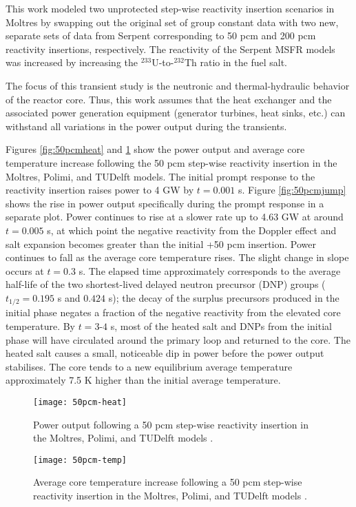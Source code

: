 This work modeled two unprotected step-wise reactivity insertion scenarios in
Moltres by swapping out the original set of group constant data with two new,
separate sets of data from Serpent corresponding to 50 pcm and 200 pcm
reactivity insertions, respectively. The reactivity of the Serpent \gls{MSFR}
models was increased by increasing the $^{233}$U-to-$^{232}$Th ratio in
the fuel salt.

The focus of this transient study is the neutronic and thermal-hydraulic
behavior of the reactor core. Thus, this work assumes that the heat exchanger
and the associated power generation equipment (generator turbines, heat sinks,
etc.) can withstand all variations in the power output during the transients.

Figures \ref{fig:50pcmheat} and \ref{fig:50pcmtemp} show the power output and
average core temperature increase following the 50 pcm step-wise reactivity
insertion in the Moltres, Polimi, and TUDelft models. The initial prompt
response to the reactivity insertion raises power to 4 GW by $t=0.001$ s.
Figure \ref{fig:50pcmjump} shows the rise in power output specifically during
the prompt response in a separate plot.
Power continues to rise at a slower rate up to 4.63 GW at around $t=0.005$ s,
at which point the negative reactivity from the Doppler effect and salt
expansion becomes greater
than the initial +50 pcm insertion. Power continues to fall as the average
core temperature rises. The slight change in slope occurs at $t=0.3$ s. The
elapsed time approximately corresponds to the average half-life of the two
shortest-lived delayed neutron precursor (DNP) groups ($t_{1/2}=0.195$ s and
$0.424$ s); the decay of the surplus precursors produced in the initial phase
negates a fraction of the negative reactivity from the elevated core
temperature. By $t=3$-$4$ s, most of the heated salt and \glspl{DNP} from the
initial phase will have circulated around the primary loop and returned to the
core. The heated salt causes a small, noticeable dip in power before the power
output stabilises. The core tends to a new equilibrium average temperature
approximately 7.5 K higher than the initial average temperature.

\begin{figure}[htbp!]
    \centering
    \texttt{[image: 50pcm-heat]}
    \caption{Power output following
    a 50 pcm step-wise reactivity insertion in the Moltres, Polimi, and
    TUDelft models \cite{fiorina_modelling_2014}.}
    \label{fig:50pcmheat}
%
    \centering
    \texttt{[image: 50pcm-temp]}
    \caption{Average core temperature increase following
    a 50 pcm step-wise reactivity insertion in the Moltres, Polimi, and
    TUDelft models \cite{fiorina_modelling_2014}.}
    \label{fig:50pcmtemp}
\end{figure}

